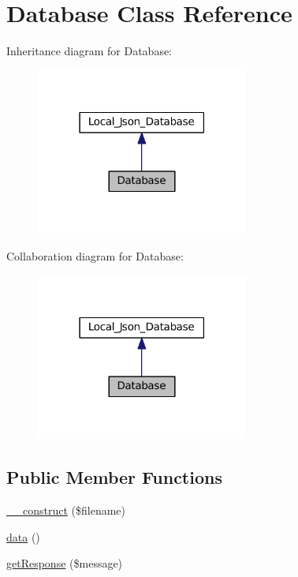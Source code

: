 \hypertarget{classDatabase}{}\section{Database Class Reference}
\label{classDatabase}


Inheritance diagram for Database\+:
\nopagebreak
\begin{figure}[H]
\begin{center}
\leavevmode
\includegraphics[width=198pt]{d0/d02/classDatabase__inherit__graph}
\end{center}
\end{figure}


Collaboration diagram for Database\+:
\nopagebreak
\begin{figure}[H]
\begin{center}
\leavevmode
\includegraphics[width=198pt]{d7/d8a/classDatabase__coll__graph}
\end{center}
\end{figure}
\subsection*{Public Member Functions}
\begin{DoxyCompactItemize}
\item 
\hyperlink{classDatabase_a0d5b394437b9aa2aa06f56acf427d554}{\+\_\+\+\_\+construct} (\$filename)
\item 
\hyperlink{classDatabase_ada6d54612cb4810751d124814348ac93}{data} ()
\item 
\hyperlink{classDatabase_aaba31ca426428cdbc9151bf058b00912}{get\+Response} (\$message)
\end{DoxyCompactItemize}
